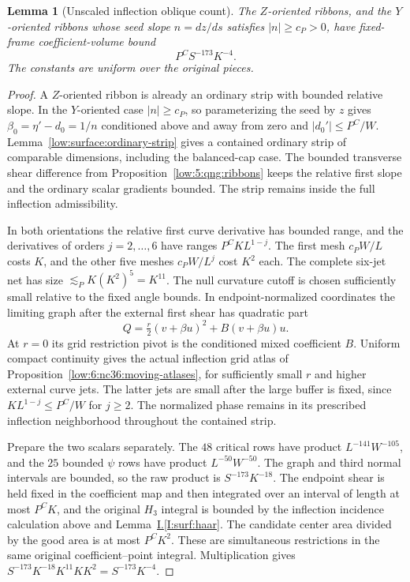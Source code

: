 \documentclass[11pt]{amsart}
\newtheorem{lemma}[theorem]{Lemma}
\theoremstyle{definition}
\theoremstyle{remark}
\numberwithin{equation}{section}
\newcommand{\partIref}[1]{\hyperref[I:#1]{I.\ref*{I:#1}}}
\begin{document}
\begin{lemma}[Unscaled inflection oblique count]\label{low:6:s36i:unscaled}
The $Z$-oriented ribbons, and the $Y$-oriented ribbons whose seed slope $n=dz/ds$ satisfies $|n|\ge c_P>0$, have fixed-frame coefficient-volume bound
\[
P^CS^{-173}K^{-4}.
\]
The constants are uniform over the original pieces.
\end{lemma}
\begin{proof}
A $Z$-oriented ribbon is already an ordinary strip with bounded relative slope. In the $Y$-oriented case $|n|\ge c_P$, so parameterizing the seed by $z$ gives $\beta_0=\eta'-d_0=1/n$ conditioned above and away from zero and $|d_0'|\le P^C/W$. Lemma~\ref{low:surface:ordinary-strip} gives a contained ordinary strip of comparable dimensions, including the balanced-cap case. The bounded transverse shear difference from Proposition~\ref{low:5:qng:ribbons} keeps the relative first slope and the ordinary scalar gradients bounded. The strip remains inside the full inflection admissibility.

In both orientations the relative first curve derivative has bounded range, and the derivatives of orders $j=2,\ldots,6$ have ranges $P^CKL^{1-j}$. The first mesh $c_PW/L$ costs $K$, and the other five meshes $c_PW/L^j$ cost $K^2$ each. The complete six-jet net has size $\lesssim_P K(K^2)^5=K^{11}$. The null curvature cutoff is chosen sufficiently small relative to the fixed angle bounds. In endpoint-normalized coordinates the limiting graph after the external first shear has quadratic part
\[
Q=\tfrac r2(v+\beta u)^2+B(v+\beta u)u.
\]
At $r=0$ its grid restriction pivot is the conditioned mixed coefficient $B$. Uniform compact continuity gives the actual inflection grid atlas of Proposition~\ref{low:6:nc36:moving-atlases}, for sufficiently small $r$ and higher external curve jets. The latter jets are small after the large buffer is fixed, since $KL^{1-j}\le P^C/W$ for $j\ge2$. The normalized phase remains in its prescribed inflection neighborhood throughout the contained strip.

Prepare the two scalars separately. The $48$ critical rows have product $L^{-141}W^{-105}$, and the $25$ bounded $\psi$ rows have product $L^{-50}W^{-50}$. The graph and third normal intervals are bounded, so the raw product is $S^{-173}K^{-18}$. The endpoint shear is held fixed in the coefficient map and then integrated over an interval of length at most $P^CK$, and the original $H_3$ integral is bounded by the inflection incidence calculation above and Lemma~\partIref{surf:haar}. The candidate center area divided by the good area is at most $P^CK^2$. These are simultaneous restrictions in the same original coefficient--point integral. Multiplication gives $S^{-173}K^{-18}K^{11}KK^2=S^{-173}K^{-4}$.
\end{proof}
\end{document}
